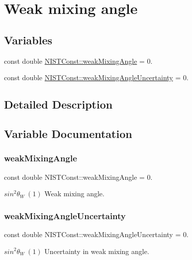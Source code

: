 \hypertarget{group___weak_mixing_angle}{}\section{Weak mixing angle}
\label{group___weak_mixing_angle}
\subsection*{Variables}
\begin{DoxyCompactItemize}
\item 
const double \hyperlink{group___weak_mixing_angle_gaf4037fe32df08c9c7eccd8487b5eab34}{N\+I\+S\+T\+Const\+::weak\+Mixing\+Angle} = 0.
\item 
const double \hyperlink{group___weak_mixing_angle_ga6b461a8ed9af6322050586b5919cda98}{N\+I\+S\+T\+Const\+::weak\+Mixing\+Angle\+Uncertainty} = 0.
\end{DoxyCompactItemize}


\subsection{Detailed Description}


\subsection{Variable Documentation}
\mbox{\label{group___weak_mixing_angle_gaf4037fe32df08c9c7eccd8487b5eab34}} 
\subsubsection{\texorpdfstring{weak\+Mixing\+Angle}{weakMixingAngle}}
{\footnotesize\ttfamily const double N\+I\+S\+T\+Const\+::weak\+Mixing\+Angle = 0.}

$sin^2 \theta_W \ (1)$ Weak mixing angle. \mbox{\label{group___weak_mixing_angle_ga6b461a8ed9af6322050586b5919cda98}} 
\subsubsection{\texorpdfstring{weak\+Mixing\+Angle\+Uncertainty}{weakMixingAngleUncertainty}}
{\footnotesize\ttfamily const double N\+I\+S\+T\+Const\+::weak\+Mixing\+Angle\+Uncertainty = 0.}

$sin^2 \theta_W \ (1)$ Uncertainty in weak mixing angle. 